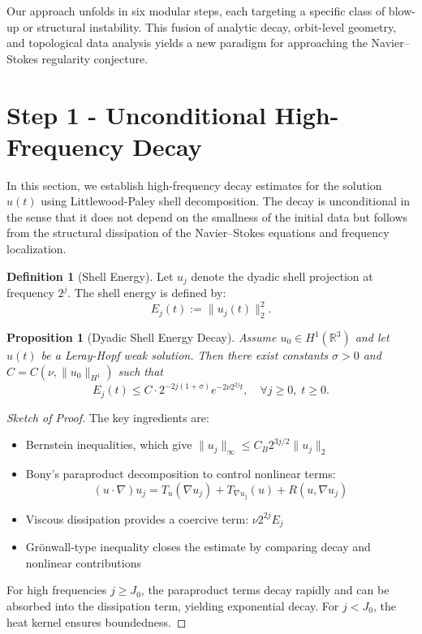 \documentclass[11pt]{article}
\newtheorem{proposition}[theorem]{Proposition}
\theoremstyle{definition}
\newtheorem{definition}[theorem]{Definition}
\begin{document}
Our approach unfolds in six modular steps, each targeting a specific class of blow-up or structural instability. This fusion of analytic decay, orbit-level geometry, and topological data analysis yields a new paradigm for approaching the Navier--Stokes regularity conjecture.


\section{Step 1 - Unconditional High-Frequency Decay}
\label{sec:HF}

In this section, we establish high-frequency decay estimates for the solution \( u(t) \) using Littlewood-Paley shell decomposition. The decay is unconditional in the sense that it does not depend on the smallness of the initial data but follows from the structural dissipation of the Navier–Stokes equations and frequency localization.

\begin{definition}[Shell Energy]
Let \( u_j \) denote the dyadic shell projection at frequency \( 2^j \). The shell energy is defined by:
\[
  E_j(t) := \|u_j(t)\|_2^2.
\]
\end{definition}

\begin{proposition}[Dyadic Shell Energy Decay]
\label{prop:shell}
Assume \( u_0 \in H^1(\mathbb{R}^3) \) and let \( u(t) \) be a Leray-Hopf weak solution. Then there exist constants \( \sigma > 0 \) and \( C = C(\nu, \|u_0\|_{H^1}) \) such that
\[
  E_j(t) \le C \cdot 2^{-2j(1+\sigma)} e^{-2\nu 2^{2j} t}, \quad \forall j \ge 0, \; t \ge 0.
\]
\end{proposition}

\begin{proof}[Sketch of Proof]
The key ingredients are:
\begin{itemize}
  \item Bernstein inequalities, which give \( \|u_j\|_\infty \le C_B 2^{3j/2} \|u_j\|_2 \)
  \item Bony's paraproduct decomposition to control nonlinear terms:
  \[
    (u \cdot \nabla) u_j = T_u(\nabla u_j) + T_{\nabla u_j}(u) + R(u, \nabla u_j)
  \]
  \item Viscous dissipation provides a coercive term: \( \nu 2^{2j} E_j \)
  \item Grönwall-type inequality closes the estimate by comparing decay and nonlinear contributions
\end{itemize}
For high frequencies \( j \ge J_0 \), the paraproduct terms decay rapidly and can be absorbed into the dissipation term, yielding exponential decay. For \( j < J_0 \), the heat kernel ensures boundedness.
\end{proof}
\end{document}
